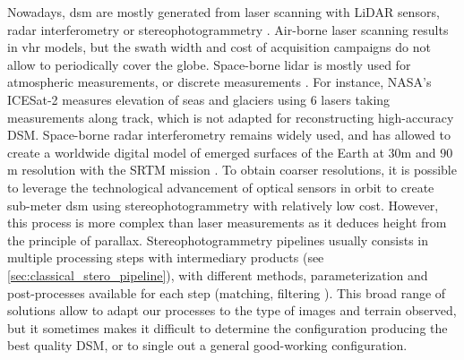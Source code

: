 Nowadays, \acrshort{dsm} are mostly generated from laser scanning with LiDAR sensors, radar interferometry or stereophotogrammetry \cite{youssefi_cars_2020}. Air-borne laser scanning results in \acrfull{vhr} models, but the swath width and cost of acquisition campaigns do not allow to periodically cover the globe. Space-borne \acrshort{lidar} is mostly used for atmospheric measurements, or discrete measurements \cite{fouladinejad_history_2019}. For instance, NASA's ICESat-2 \cite{jasinski_atlasicesat-2_2020} measures elevation of seas and glaciers using 6 lasers taking measurements along track, which is not adapted for reconstructing high-accuracy DSM. Space-borne radar interferometry remains widely used, and has allowed to create a worldwide digital model of emerged surfaces of the Earth at $30$m and $90$m resolution with the SRTM mission \cite{farr_shuttle_2007}. To obtain coarser resolutions, it is possible to leverage the technological advancement of optical sensors in orbit to create sub-meter \acrshort{dsm} using stereophotogrammetry with relatively low cost. However, this process is more complex than laser measurements as it deduces height from the principle of parallax. Stereophotogrammetry pipelines usually consists in multiple processing steps with intermediary products (see \ref{sec:classical_stero_pipeline}), with different methods, parameterization and post-processes available for each step (\eg matching, filtering \etc). This broad range of solutions allow to adapt our processes to the type of images and terrain observed, but it sometimes makes it difficult to determine the configuration producing the best quality DSM, or to single out a general good-working configuration. 

